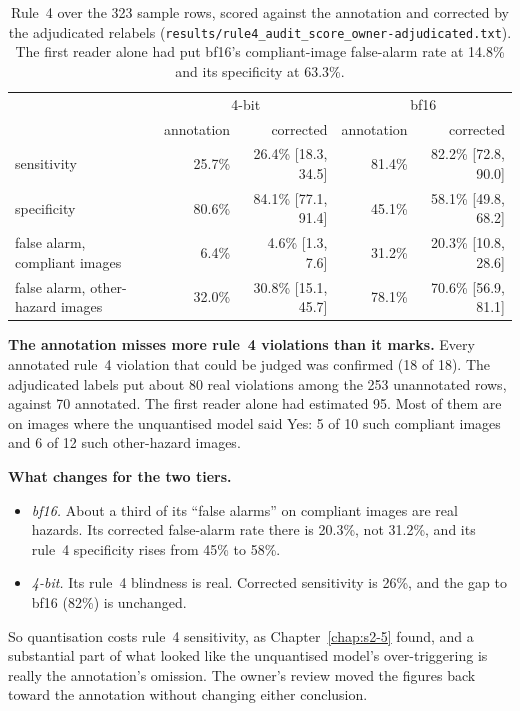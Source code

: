 \begin{table}[tbp]
\centering
\begin{tabular}{lrrrr}
\toprule
 & \multicolumn{2}{c}{4-bit} & \multicolumn{2}{c}{bf16} \\
 & annotation & corrected & annotation & corrected \\
\midrule
sensitivity & 25.7\% & 26.4\% [18.3, 34.5] & 81.4\% & 82.2\% [72.8, 90.0] \\
specificity & 80.6\% & 84.1\% [77.1, 91.4] & 45.1\% & 58.1\% [49.8, 68.2] \\
false alarm, compliant images & 6.4\% & 4.6\% [1.3, 7.6] & 31.2\% & 20.3\% [10.8, 28.6] \\
false alarm, other-hazard images & 32.0\% & 30.8\% [15.1, 45.7] & 78.1\% & 70.6\% [56.9, 81.1] \\
\bottomrule
\end{tabular}
\caption{Rule~4 over the 323 sample rows, scored against the annotation and corrected by the adjudicated
relabels (\texttt{results/rule4\_audit\_score\_owner-adjudicated.txt}). The first reader alone had put
bf16's compliant-image false-alarm rate at 14.8\% and its specificity at 63.3\%.}
\label{tab:s27}
\end{table}

\textbf{The annotation misses more rule~4 violations than it marks.} Every annotated rule~4 violation
that could be judged was confirmed (18 of 18). The adjudicated labels put about 80 real violations among
the 253 unannotated rows, against 70 annotated. The first reader alone had estimated 95. Most of them
are on images where the unquantised model said Yes: 5 of 10 such compliant images and 6 of 12 such
other-hazard images.

\textbf{What changes for the two tiers.}
\begin{itemize}
\item \emph{bf16.} About a third of its ``false alarms'' on compliant images are real hazards. Its
corrected false-alarm rate there is 20.3\%, not 31.2\%, and its rule~4 specificity rises from 45\% to
58\%.
\item \emph{4-bit.} Its rule~4 blindness is real. Corrected sensitivity is 26\%, and the gap to bf16
(82\%) is unchanged.
\end{itemize}
So quantisation costs rule~4 sensitivity, as Chapter~\ref{chap:s2-5} found, and a substantial part of
what looked like the unquantised model's over-triggering is really the annotation's omission. The owner's
review moved the figures back toward the annotation without changing either conclusion.

